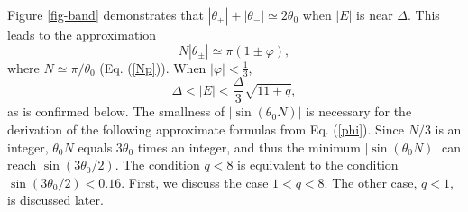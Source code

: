 \documentclass{jpsj3}
\begin{document}
Figure \ref{fig-band} demonstrates that $|\theta_+| + |\theta_-| \simeq 2\theta_0$ 
when $|E|$ is near $\Delta$.
This leads to the approximation
\begin{equation} 
N|\theta_{\pm}| \simeq \pi(1 \pm \varphi),
\label{phi}
\end{equation} 
where $N \simeq \pi/\theta_0$ (Eq. (\ref{Np})).
When $|\varphi|< \frac{1}{3}$,
\begin{equation} 
\Delta < |E| < \frac{\Delta}{3}\sqrt{11+q},
\label{Ep-range}
\end{equation} 
as is confirmed below.
The smallness of $|\sin(\theta_0 N)|$
is necessary for the derivation of
the following approximate formulas from Eq. (\ref{phi}).
Since $N/3$ is an integer, 
$\theta_0 N$ equals $3\theta_0$ times an integer, 
and thus the minimum $|\sin(\theta_0 N)|$
can reach $\sin(3 \theta_0 /2)$.
The condition $q<8$ is equivalent to the condition
$\sin(3\theta_0/2) < 0.16$.
First,  we discuss the case $1<q< 8$.
The other case, $q< 1$, is discussed later.
\end{document}
